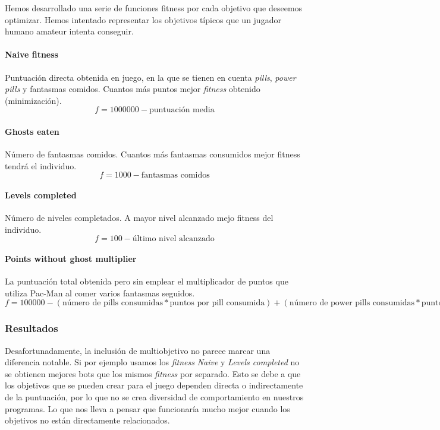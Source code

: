 Hemos desarrollado una serie de funciones fitness por cada objetivo que deseemos optimizar. Hemos intentado representar los objetivos típicos que un jugador humano amateur intenta conseguir.

\paragraph{Naive fitness}
Puntuación directa obtenida en juego, en la que se tienen en cuenta \textit{pills}, \textit{power pills} y fantasmas comidos. Cuantos más puntos mejor \textit{fitness} obtenido (minimización).
\begin{equation}
f = 1000000 - \textrm{puntuación media}
\end{equation}

\paragraph{Ghosts eaten}
Número de fantasmas comidos. Cuantos más fantasmas consumidos mejor fitness tendrá el individuo.
\begin{equation}
f = 1000 - \textrm{fantasmas comidos}
\end{equation}

\paragraph{Levels completed}
Número de niveles completados. A mayor nivel alcanzado mejo fitness del individuo.
\begin{equation}
f = 100 - \textrm{último nivel alcanzado}
\end{equation}

\paragraph{Points without ghost multiplier}
La puntuación total obtenida pero sin emplear el multiplicador de puntos que utiliza Pac-Man al comer varios fantasmas seguidos.
\begin{equation}
f = 100000 - (\textrm{número de pills consumidas} * \textrm{puntos por pill consumida})
+ (\textrm{número de power pills consumidas} * \textrm{puntos por power pill consumida})
+ (\textrm{número de fantasmas consumidos * puntos por fantasma consumida})
\end{equation}

\subsubsection{Resultados}
Desafortunadamente, la inclusión de multiobjetivo no parece marcar una diferencia notable. Si por ejemplo usamos los \textit{fitness} \textit{Naive} y \textit{Levels completed} no se obtienen mejores bots que los mismos \textit{fitness} por separado. Esto se debe a que los objetivos que se pueden crear para el juego dependen directa o indirectamente de la puntuación, por lo que no se crea diversidad de comportamiento en nuestros programas. Lo que nos lleva a pensar que funcionaría mucho mejor cuando los objetivos no están directamente relacionados.
 
